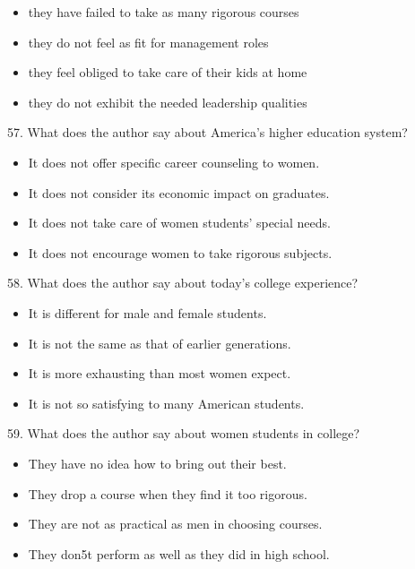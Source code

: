 \documentclass[UTF8,11pt]{ctexart}
\begin{document}
\begin{itemize}[leftmargin=2em,itemsep=.2em,topsep=.4em]\item[A.] they have failed to take as many rigorous courses
\item[B.] they do not feel as fit for management roles
\item[C.] they feel obliged to take care of their kids at home
\item[D.] they do not exhibit the needed leadership qualities
\end{itemize}

57. What does the author say about America’s higher education system?


\begin{itemize}[leftmargin=2em,itemsep=.2em,topsep=.4em]\item[A.] It does not offer specific career counseling to women.
\item[B.] It does not consider its economic impact on graduates.
\item[C.] It does not take care of women students’ special needs.
\item[D.] It does not encourage women to take rigorous subjects.
\end{itemize}

58. What does the author say about today’s college experience?


\begin{itemize}[leftmargin=2em,itemsep=.2em,topsep=.4em]\item[A.] It is different for male and female students.
\item[B.] It is not the same as that of earlier generations.
\item[C.] It is more exhausting than most women expect.
\item[D.] It is not so satisfying to many American students.
\end{itemize}

59. What does the author say about women students in college?


\begin{itemize}[leftmargin=2em,itemsep=.2em,topsep=.4em]\item[A.] They have no idea how to bring out their best.
\item[B.] They drop a course when they find it too rigorous.
\item[C.] They are not as practical as men in choosing courses.
\item[D.] They don5t perform as well as they did in high school.
\end{itemize}
\end{document}
